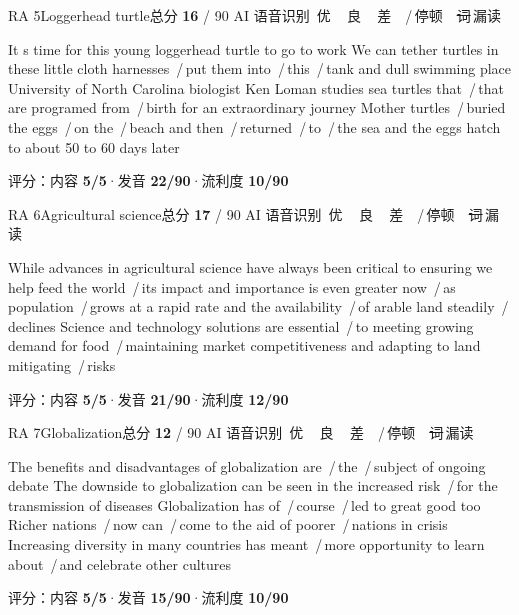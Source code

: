 \documentclass[11pt]{article}
\newcommand{\sfull}[1]{\textcolor{cFix}{\bfseries #1}}     %
\newcommand{\spart}[1]{\textcolor{cPartial}{\bfseries #1}} %
\newcommand{\szero}[1]{\textcolor{cWrong}{\bfseries #1}}   %
\newcommand{\sg}[1]{\textcolor{cSpkGood}{#1}}   %
\newcommand{\sy}[1]{\textcolor{cSpkOk}{#1}}     %
\newcommand{\sr}[1]{\textcolor{cSpkBad}{#1}}    %
\newcommand{\pse}{{\color{gray}\,/\,}}          %
\newcommand{\asrlegend}{{\footnotesize\color{gray}AI 语音识别\quad
  {\color{cSpkGood}\textbullet}\,优\ \ {\color{cSpkOk}\textbullet}\,良\ \
  {\color{cSpkBad}\textbullet}\,差\ \ {\color{gray}/}\,停顿\ \
  {\color{cSpkBad}\sout{词}}\,漏读}}
\begin{document}
\begin{qblock}{RA 5\quad Loggerhead turtle}{总分 \textcolor{cAccent}{\bfseries 16} / 90}
\asrlegend
\begin{asrbox}
\sy{It s time for this young} \sy{loggerhead} \sg{turtle to go to work} \sg{We can} \sr{tether} \sg{turtles in these little} \sy{cloth harnesses} \pse \sy{put them into} \pse \sy{this} \pse \sy{tank and dull} \sg{swimming place University of} \sg{North Carolina biologist Ken Loman} \sg{studies} \sg{sea turtles that} \pse \sy{that are programed from} \pse \sg{birth for an} \sg{extraordinary journey Mother turtles} \pse \sy{buried the} \sg{eggs} \pse \sg{on the} \pse \sg{beach and then} \pse \sr{returned} \pse \sg{to} \pse \sg{the sea and the eggs hatch to} \sg{about 50 to 60 days later}
\end{asrbox}
{\small 评分：内容 \sfull{5/5}\quad·\quad 发音 \spart{22/90}\quad·\quad 流利度 \szero{10/90}}
\end{qblock}

\begin{qblock}{RA 6\quad Agricultural science}{总分 \textcolor{cAccent}{\bfseries 17} / 90}
\asrlegend
\begin{asrbox}
\sg{While} \sy{advances} \sg{in agricultural science have always been critical to} \sg{ensuring we help feed the world} \pse \sg{its impact and importance is even} \sy{greater now} \pse \sy{as population} \pse \sy{grows at} \sg{a rapid rate and the availability} \pse \sy{of arable land steadily} \pse \sg{declines Science and technology solutions are} \sy{essential} \pse \sg{to meeting growing demand for} \sy{food} \pse \sy{maintaining market competitiveness and adapting to land mitigating} \pse \sg{risks}
\end{asrbox}
{\small 评分：内容 \sfull{5/5}\quad·\quad 发音 \spart{21/90}\quad·\quad 流利度 \szero{12/90}}
\end{qblock}

\begin{qblock}{RA 7\quad Globalization}{总分 \textcolor{cAccent}{\bfseries 12} / 90}
\asrlegend
\begin{asrbox}
\sg{The benefits and} \sy{disadvantages of} \sg{globalization are} \pse \sy{the} \pse \sy{subject of ongoing debate} \sg{The downside to} \sg{globalization can be seen in the increased risk} \pse \sg{for the transmission of diseases Globalization has of} \pse \sy{course} \pse \sy{led to great good too Richer nations} \pse \sy{now can} \pse \sy{come to the aid of poorer} \pse \sg{nations in} \sy{crisis} \sg{Increasing diversity in many countries has meant} \pse \sy{more opportunity to learn about} \pse \sg{and celebrate other cultures}
\end{asrbox}
{\small 评分：内容 \sfull{5/5}\quad·\quad 发音 \spart{15/90}\quad·\quad 流利度 \szero{10/90}}
\end{qblock}
\end{document}
